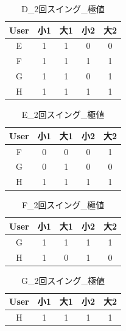 \begin{table}[tb]
    \caption{D\_2回スイング\_極値}
    \vspace{0.5cm}
    \centering
    \begin{tabular}{|c|c|c|c|c|}
        \hline
        User & 小1 & 大1 & 小2 & 大2 \\ \hline
        E & 1&1&0&0 \\
        F & 1&1&1&1 \\
        G & 1&1&0&1 \\
        H & 1&1&1&1 \\
        \hline
    \end{tabular}
\end{table}
\begin{table}[tb]
    \caption{E\_2回スイング\_極値}
    \vspace{0.5cm}
    \centering
    \begin{tabular}{|c|c|c|c|c|}
        \hline
        User & 小1 & 大1 & 小2 & 大2 \\ \hline
        F & \color{red}0&\color{red}0&\color{red}0&\color{red}1 \\
        G & \color{red}0&\color{red}1&\color{red}0&\color{red}0 \\
        H & 1&1&1&1 \\
        \hline
    \end{tabular}
\end{table}
\begin{table}[tb]
    \caption{F\_2回スイング\_極値}
    \vspace{0.5cm}
    \centering
    \begin{tabular}{|c|c|c|c|c|}
        \hline
        User & 小1 & 大1 & 小2 & 大2 \\ \hline
        G & 1&1&1&1 \\
        H & 1&0&1&0 \\
        \hline
    \end{tabular}
\end{table}
\begin{table}[tb]
    \caption{G\_2回スイング\_極値}
    \vspace{0.5cm}
    \centering
    \begin{tabular}{|c|c|c|c|c|}
        \hline
        User & 小1 & 大1 & 小2 & 大2 \\ \hline
        H & 1&1&1&1 \\
        \hline
    \end{tabular}
\end{table}

